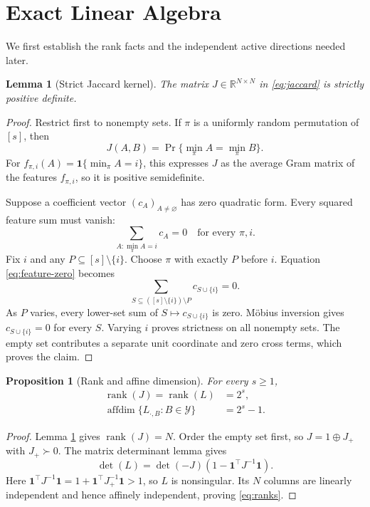 \documentclass[twoside]{article}
\newtheorem{proposition}[theorem]{Proposition}
\newtheorem{lemma}[theorem]{Lemma}
\newcommand{\Y}{\mathcal Y}
\newcommand{\affdim}{\operatorname{affdim}}
\newcommand{\rank}{\operatorname{rank}}
\newcommand{\1}{\mathbf 1}
\begin{document}
\section{Exact Linear Algebra}

We first establish the rank facts and the independent active directions needed later.

\begin{lemma}[Strict Jaccard kernel]
\label{lem:pd}
The matrix $J\in\mathbb R^{N\times N}$ in \eqref{eq:jaccard} is strictly positive definite.
\end{lemma}

\begin{proof}
Restrict first to nonempty sets. If $\pi$ is a uniformly random permutation of $[s]$, then
\begin{equation}
J(A,B)=\Pr\{\min_\pi A=\min_\pi B\}.
\label{eq:minhash}
\end{equation}
For $f_{\pi,i}(A)=\1\{\min_\pi A=i\}$, this expresses $J$ as the average Gram matrix of the features $f_{\pi,i}$, so it is positive semidefinite.

Suppose a coefficient vector $(c_A)_{A\ne\varnothing}$ has zero quadratic form. Every squared feature sum must vanish:
\begin{equation}
\sum_{A:\min_\pi A=i}c_A=0
\quad\text{for every }\pi,i.
\label{eq:feature-zero}
\end{equation}
Fix $i$ and any $P\subseteq[s]\setminus\{i\}$. Choose $\pi$ with exactly $P$ before $i$. Equation \eqref{eq:feature-zero} becomes
\begin{equation}
\sum_{S\subseteq([s]\setminus\{i\})\setminus P}c_{S\cup\{i\}}=0.
\end{equation}
As $P$ varies, every lower-set sum of $S\mapsto c_{S\cup\{i\}}$ is zero. M\"obius inversion gives $c_{S\cup\{i\}}=0$ for every $S$. Varying $i$ proves strictness on all nonempty sets. The empty set contributes a separate unit coordinate and zero cross terms, which proves the claim.
\end{proof}

\begin{proposition}[Rank and affine dimension]
\label{prop:rank}
For every $s\geq1$,
\begin{align}
\rank(J)=\rank(L)&=2^s,\\
\affdim\{L_{\cdot,B}:B\in\Y\}&=2^s-1.
\label{eq:ranks}
\end{align}
\end{proposition}

\begin{proof}
Lemma \ref{lem:pd} gives $\rank(J)=N$. Order the empty set first, so $J=1\oplus J_+$ with $J_+\succ0$. The matrix determinant lemma gives
\begin{equation}
\det(L)=\det(-J)\left(1-\1^\top J^{-1}\1\right).
\end{equation}
Here $\1^\top J^{-1}\1=1+\1^\top J_+^{-1}\1>1$, so $L$ is nonsingular. Its $N$ columns are linearly independent and hence affinely independent, proving \eqref{eq:ranks}.
\end{proof}
\end{document}
